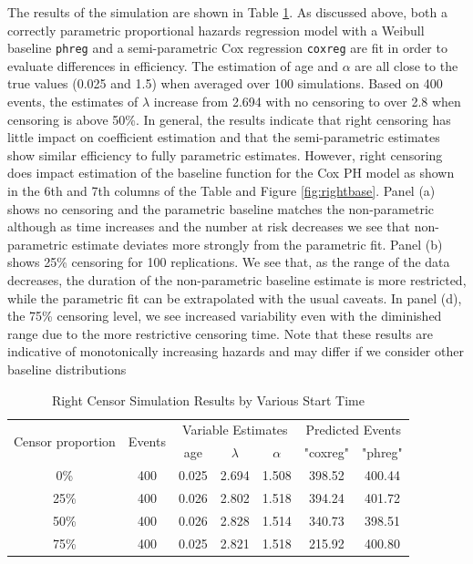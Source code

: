 \documentclass[12pt,letterpaper]{article}
\begin{document}
The results of the simulation are shown in Table \ref{tab:right2}. As discussed above, both a correctly parametric proportional hazards regression model with a Weibull baseline {\tt phreg} and a semi-parametric Cox regression {\tt coxreg} are fit in order to evaluate differences in efficiency. The estimation of age and $\alpha$ are all close to the true values (0.025 and 1.5) when averaged over 100 simulations.  Based on 400 events, the estimates of $\lambda$ increase from 2.694 with no censoring to over 2.8 when censoring is above 50\%.  In general, the results indicate that right censoring has little impact on coefficient estimation and that the semi-parametric estimates show similar efficiency to fully parametric estimates. However, right censoring does impact estimation of the  baseline function for the Cox PH model as shown in the 6th and 7th columns of the Table and Figure \ref{fig:rightbase}.  Panel (a) shows no censoring and the parametric baseline matches the non-parametric although as time increases and the number at risk decreases we see that non-parametric estimate deviates more strongly from the parametric fit.  Panel (b) shows 25\% censoring for 100 replications.  We see that, as the range of the data decreases, the duration of the non-parametric baseline estimate is more restricted, while the parametric fit can be extrapolated with the usual caveats.  In panel (d), the 75\% censoring level, we see increased variability even with the diminished range due to the more restrictive censoring time.  Note that these results are indicative of monotonically increasing hazards and may differ if we consider other baseline distributions
 \begin{table}[htbp]
 	\renewcommand{\arraystretch}{1.5}
 	\centering
 	\caption{Right Censor Simulation Results by Various Start Time}
 	\begin{tabular}{ccccccc}
 		\toprule
 		\multicolumn{1}{c}{\multirow{2}{1.5cm}{Censor proportion}}  & \multirow{2}[4]{*}{Events} & \multicolumn{3}{c}{Variable Estimates} & \multicolumn{2}{c}{Predicted Events} \\ \cline{3-7}
 		&       & age   & $\lambda$ & $\alpha$ & "coxreg" & "phreg" \\
 		\midrule
 		0\%   & 400   & 0.025 & 2.694 & 1.508 & 398.52 & 400.44 \\
 		25\%  & 400   & 0.026 & 2.802 & 1.518 & 394.24 & 401.72 \\
 		50\%  & 400   & 0.026 & 2.828 & 1.514 & 340.73 & 398.51 \\
 		75\%  & 400   & 0.025 & 2.821 & 1.518 & 215.92 & 400.80 \\
 		\bottomrule
 	\end{tabular}%
 	\label{tab:right2}%
 \end{table}%
\end{document}
